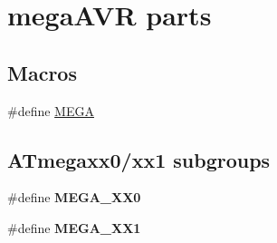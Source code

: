 \hypertarget{group__mega__part__macros__group}{\section{mega\-A\-V\-R parts}
\label{group__mega__part__macros__group}
}
\subsection*{Macros}
\begin{DoxyCompactItemize}
\item 
\#define \hyperlink{group__mega__part__macros__group_ga78a6115b485de47c7cc56b224c558ea2}{M\-E\-G\-A}
\end{DoxyCompactItemize}
\subsection*{A\-Tmegaxx0/xx1 subgroups}
\begin{DoxyCompactItemize}
\item 
\#define {\bfseries M\-E\-G\-A\-\_\-\-X\-X0}
\item 
\#define {\bfseries M\-E\-G\-A\-\_\-\-X\-X1}
\end{DoxyCompactItemize}
